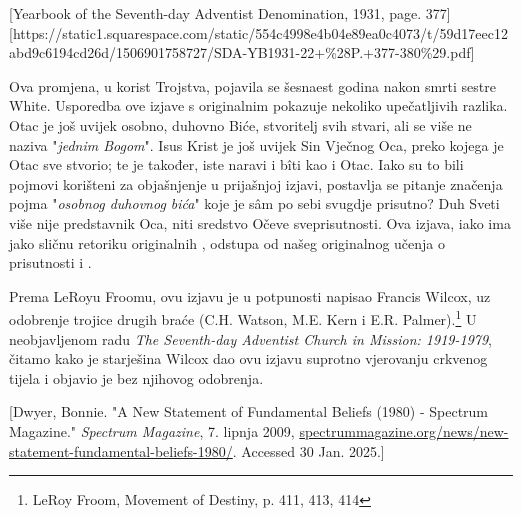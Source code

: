 
[Yearbook of the Seventh-day Adventist Denomination, 1931, page. 377][https://static1.squarespace.com/static/554c4998e4b04e89ea0c4073/t/59d17eec12abd9c6194cd26d/1506901758727/SDA-YB1931-22+\%28P.+377-380\%29.pdf]

Ova promjena, u korist Trojstva, pojavila se šesnaest godina nakon smrti sestre White. Usporedba ove izjave s originalnim  pokazuje nekoliko upečatljivih razlika. Otac je još uvijek osobno, duhovno Biće, stvoritelj svih stvari, ali se više ne naziva "\textit{jednim Bogom}". Isus Krist je još uvijek Sin Vječnog Oca, preko kojega je Otac sve stvorio; te je također, iste naravi i bîti kao i Otac. Iako su to bili pojmovi korišteni za objašnjenje  u prijašnjoj izjavi, postavlja se pitanje značenja pojma "\textit{osobnog duhovnog bića}" koje je sâm po sebi svugdje prisutno? Duh Sveti više nije predstavnik Oca, niti sredstvo Očeve sveprisutnosti. Ova izjava, iako ima jako sličnu retoriku originalnih , odstupa od našeg originalnog učenja o prisutnosti i .

Prema LeRoyu Froomu, ovu izjavu je u potpunosti napisao Francis Wilcox, uz odobrenje trojice drugih braće (C.H. Watson, M.E. Kern i E.R. Palmer).\footnote{LeRoy Froom, Movement of Destiny, p. 411, 413, 414} U neobjavljenom radu \textit{The Seventh-day Adventist Church in Mission: 1919-1979}, čitamo kako je starješina Wilcox dao ovu izjavu suprotno vjerovanju crkvenog tijela i objavio je bez njihovog odobrenja.

[Dwyer, Bonnie. "A New Statement of Fundamental Beliefs (1980) - Spectrum Magazine." \textit{Spectrum Magazine}, 7. lipnja 2009, \href{https://spectrummagazine.org/news/new-statement-fundamental-beliefs-1980/}{spectrummagazine.org/news/new-statement-fundamental-beliefs-1980/}. Accessed 30 Jan. 2025.]

